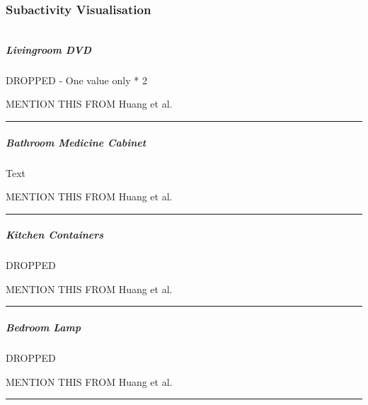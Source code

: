 \documentclass[11pt]{article}
\newcommand{\prompt}[4]{
        \llap{{\color{#2}[#3]: #4}}\vspace{-1.25em}
    }
\begin{document}
    \hypertarget{subactivity-visualisation}{%
\subsubsection{Subactivity
Visualisation}\label{subactivity-visualisation}}

    

    \begin{tcolorbox}[breakable, size=fbox, boxrule=1pt, pad at break*=1mm,colback=cellbackground, colframe=cellborder]
\prompt{In}{incolor}{ }{\hspace{4pt}}
\begin{Verbatim}[commandchars=\\\{\}]

\end{Verbatim}
\end{tcolorbox}

    \hypertarget{livingroom-dvd}{%
\subparagraph{Livingroom DVD}\label{livingroom-dvd}}

    DROPPED - One value only * 2

    MENTION THIS FROM Huang et al.~

\begin{center}\rule{0.5\linewidth}{\linethickness}\end{center}

    \hypertarget{bathroom-medicine-cabinet}{%
\subparagraph{Bathroom Medicine
Cabinet}\label{bathroom-medicine-cabinet}}

    Text

    MENTION THIS FROM Huang et al.~

\begin{center}\rule{0.5\linewidth}{\linethickness}\end{center}

    \hypertarget{kitchen-containers}{%
\subparagraph{Kitchen Containers}\label{kitchen-containers}}

    DROPPED

    MENTION THIS FROM Huang et al.~

\begin{center}\rule{0.5\linewidth}{\linethickness}\end{center}

    \hypertarget{bedroom-lamp}{%
\subparagraph{Bedroom Lamp}\label{bedroom-lamp}}

    DROPPED

    MENTION THIS FROM Huang et al.~

\begin{center}\rule{0.5\linewidth}{\linethickness}\end{center}
\end{document}
